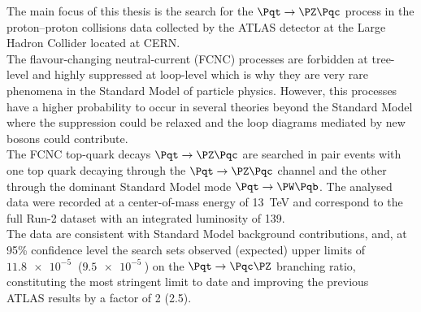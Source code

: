 \begin{adjustwidth}{1.5cm}{1.5cm}
	The main focus of this thesis is the search for the $\Pqt\rightarrow\PZ\Pqc$ process in the 
	proton–proton collisions data collected by the ATLAS detector at 
	the Large Hadron Collider located at CERN.\\		
	The flavour-changing neutral-current (FCNC) processes are forbidden at tree-level and 
	highly suppressed at loop-level which is why they are very rare phenomena in the Standard Model of particle physics.
	However, this processes have a higher probability to occur in several theories beyond the Standard Model where the 
	suppression could be relaxed and the loop diagrams mediated by new bosons could contribute.\\	
	The FCNC top-quark decays $\mathrm{\Pqt\rightarrow\PZ\Pqc}$ are searched in 
	\ttbar pair events with one top quark decaying through the $\mathrm{\Pqt\rightarrow\PZ\Pqc}$ channel 
	and the other through the dominant Standard Model mode $\mathrm{\Pqt\rightarrow\PW\Pqb}$.
	The analysed data were recorded at a center-of-mass energy of \SI{13}{\TeV} and correspond to the full Run-2 dataset 
	with an integrated luminosity of \SI{139}{\ifb}.\\
	The data are consistent with Standard Model background contributions, and, at 95\% confidence level the search sets observed (expected) upper limits of $\mathrm{\SI{11.8e-5}{}}$ ($\mathrm{\SI{9.5e-5}{}}$) on the $\mathrm{\Pqt\rightarrow\Pqc\PZ}$ branching ratio, constituting the most stringent limit to date and improving the previous\\ ATLAS results by a factor of 2 (2.5).
		
\end{adjustwidth}




